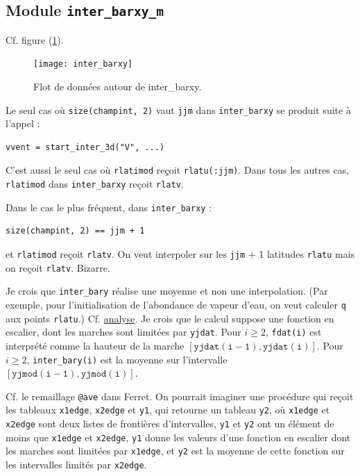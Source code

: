 \documentclass[a4paper,english,french]{article}
\begin{document}
\subsection{Module \texttt{inter\_barxy\_m}}

Cf. figure (\ref{fig:inter_barxy}).
\begin{figure}
  \centering
  \texttt{[image: inter\_barxy]}
  \caption{Flot de données autour de inter\_barxy.}
  \label{fig:inter_barxy}
\end{figure}

Le seul cas où \verb+size(champint, 2)+ vaut \verb+jjm+ dans
\verb+inter_barxy+ se produit suite à l'appel :
\begin{verbatim}
vvent = start_inter_3d("V", ...)
\end{verbatim}
C'est aussi le seul cas où \verb+rlatimod+ reçoit \verb+rlatu(:jjm)+.
Dans tous les autres cas, \verb+rlatimod+ dans \verb+inter_barxy+
reçoit \verb+rlatv+.

Dans le cas le plus fréquent, dans \verb+inter_barxy+ :
\begin{verbatim}
size(champint, 2) == jjm + 1
\end{verbatim}
et \verb+rlatimod+ reçoit \verb+rlatv+. On veut interpoler sur les
\verb+jjm+ + 1 latitudes \verb+rlatu+ mais on reçoit \verb+rlatv+.
Bizarre.

Je crois que \verb+inter_bary+ réalise une moyenne et non une
interpolation. (Par exemple, pour l'initialisation de l'abondance de
vapeur d'eau, on veut calculer \verb+q+ aux points \verb+rlatu+.)  Cf.
\href{../../../LMDZ_results_texfol/LMDZ_results.pdf}{analyse}.  Je
crois que le calcul suppose une fonction en escalier, dont les marches
sont limitées par \verb+yjdat+. Pour $i \ge 2$, \verb+fdat(i)+ est
interprété comme la hauteur de la marche
$[\mathtt{yjdat(i-1)}, \mathtt{yjdat(i)}]$. Pour $i \ge 2$,
\verb+inter_bary(i)+ est la moyenne sur l'intervalle
$[\mathtt{yjmod(i-1)}, \mathtt{yjmod(i)}]$.

Cf. le remaillage \verb+@ave+ dans Ferret. On pourrait imaginer une
procédure qui reçoit les tableaux \verb+x1edge+, \verb+x2edge+ et
\verb+y1+, qui retourne un tableau \verb+y2+, où \verb+x1edge+ et
\verb+x2edge+ sont deux listes de frontières d'intervalles, \verb+y1+
et \verb+y2+ ont un élément de moins que \verb+x1edge+ et
\verb+x2edge+, \verb+y1+ donne les valeurs d'une fonction en escalier
dont les marches sont limitées par \verb+x1edge+, et \verb+y2+ est la
moyenne de cette fonction sur les intervalles limités par
\verb+x2edge+.
\end{document}
